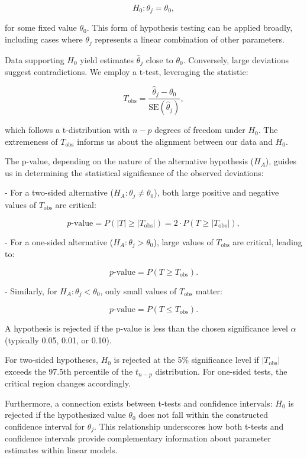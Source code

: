\documentclass{article}
\begin{document}
\[
H_0: \theta_{j} = \theta_{0},
\]

for some fixed value $\theta_0$. This form of hypothesis testing can be applied broadly, including cases where $\theta_j$ represents a linear combination of other parameters.

Data supporting $H_0$ yield estimates $\hat{\theta}_j$ close to $\theta_0$. Conversely, large deviations suggest contradictions. We employ a t-test, leveraging the statistic:

\[
T_{\text{obs}} = \frac{\hat{\theta}_{j} - \theta_{0}}{\text{SE}(\hat{\theta}_{j})},
\]

which follows a t-distribution with $n-p$ degrees of freedom under $H_0$. The extremeness of $T_{\text{obs}}$ informs us about the alignment between our data and $H_0$.

The p-value, depending on the nature of the alternative hypothesis ($H_A$), guides us in determining the statistical significance of the observed deviations:

- For a two-sided alternative ($H_A: \theta_{j} \neq \theta_{0}$), both large positive and negative values of $T_{\text{obs}}$ are critical:

  \[
  p\text{-value} = P(|T| \geq |T_{\text{obs}}|) = 2 \cdot P(T \geq |T_{\text{obs}}|),
  \]

- For a one-sided alternative ($H_A: \theta_{j} > \theta_{0}$), large values of $T_{\text{obs}}$ are critical, leading to:

  \[
  p\text{-value} = P(T \geq T_{\text{obs}}).
  \]

- Similarly, for $H_A: \theta_{j} < \theta_{0}$, only small values of $T_{\text{obs}}$ matter:

  \[
  p\text{-value} = P(T \leq T_{\text{obs}}).
  \]

A hypothesis is rejected if the p-value is less than the chosen significance level $\alpha$ (typically 0.05, 0.01, or 0.10).

For two-sided hypotheses, $H_0$ is rejected at the 5\% significance level if $|T_{\text{obs}}|$ exceeds the 97.5th percentile of the $t_{n-p}$ distribution. For one-sided tests, the critical region changes accordingly.

Furthermore, a connection exists between t-tests and confidence intervals: $H_0$ is rejected if the hypothesized value $\theta_0$ does not fall within the constructed confidence interval for $\theta_j$. This relationship underscores how both t-tests and confidence intervals provide complementary information about parameter estimates within linear models.
\end{document}
